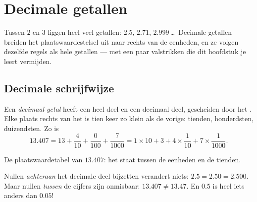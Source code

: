 \chapter{Decimale getallen}\label{ch:g6:decimals}

Tussen $2$ en $3$ liggen heel veel getallen: $2.5$, $2.71$,
$2.999$\,\dots\ Decimale getallen breiden het plaatswaardestelsel uit naar
rechts van de eenheden, en ze volgen dezelfde regels als hele getallen ---
met een paar valstrikken die dit hoofdstuk je leert vermijden.

\section{Decimale schrijfwijze}

\begin{definition}\label{def:g6:decimals:places}
Een \emph{decimaal getal} heeft een heel deel en een
decimaal deel, gescheiden door het . Elke plaats rechts van het
 is tien keer zo klein als de vorige: tienden, honderdsten,
duizendsten. Zo is
\[
13.407 = 13 + \frac{4}{10} + \frac{0}{100} + \frac{7}{1000}
= 1 \times 10 + 3 + 4 \times \frac{1}{10} + 7 \times \frac{1}{1000}.
\]
\end{definition}

\begin{omfigure}

{\small De plaatswaardetabel van $13.407$: het  staat tussen de
eenheden en de tienden.}
\end{omfigure}

\begin{remark}
Nullen \emph{achteraan} het decimale deel bijzetten verandert niets:
$2.5 = 2.50 = 2.500$. Maar nullen \emph{tussen} de cijfers zijn onmisbaar:
$13.407 \neq 13.47$. En $0.5$ is heel iets anders dan $0.05$!
\end{remark}

